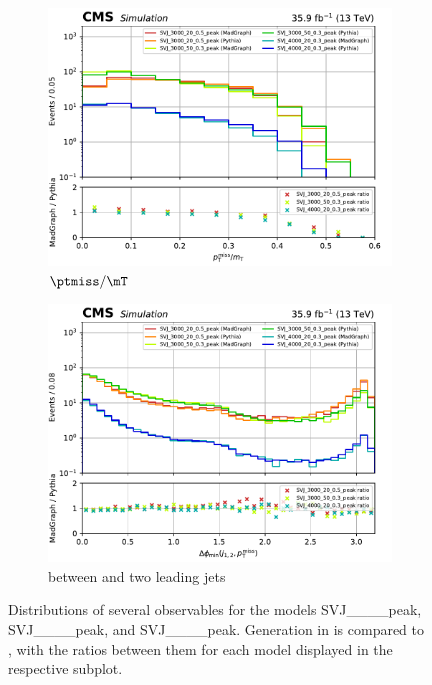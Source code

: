 \begin{figure}[htbp]
    \begin{subfigure}[b]{0.48\textwidth}
        \includegraphics[width=\textwidth]{figures/madgraph_pythia_comparisons/with_ratios/part2/met_over_mt.pdf}
        \caption{$\ptmiss/\mT$}
    \end{subfigure}
    \hfill
    \begin{subfigure}[b]{0.48\textwidth}
        \includegraphics[width=\textwidth]{figures/madgraph_pythia_comparisons/with_ratios/part2/min_dphi.pdf}
        \caption{\mindphi between \ptmiss and two leading \glspl{jet}}
    \end{subfigure}
    \caption[Distributions of several observables for the models SVJ\_\_\_\_\-peak, SVJ\_\_\_\_\-peak, and SVJ\_\_\_\_\-peak]{Distributions of several observables for the models SVJ\_\_\_\_\-peak, SVJ\_\_\_\_\-peak, and SVJ\_\_\_\_\-peak. Generation in \MGvATNLO is compared to \PYTHIAEIGHT, with the ratios between them for each model displayed in the respective subplot.}
    \label{fig:svj_mg_pythia_comparison_set2}
\end{figure}

